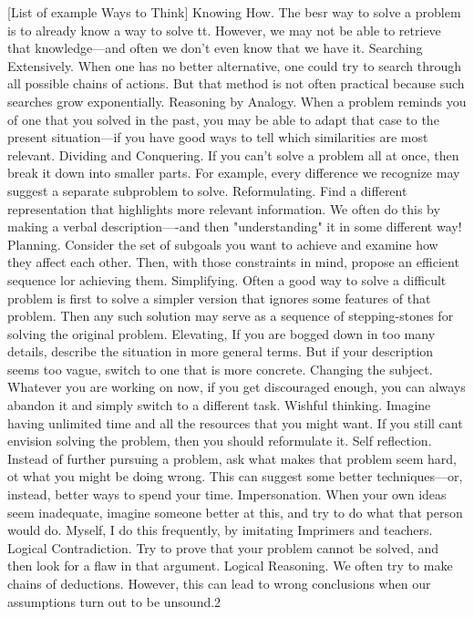 \documentclass[10pt,a4paper]{article}
\begin{document}
[List of example Ways to Think]
Knowing How. The besr way to solve a problem is to already know a way to solve tt. However, we may not be able to retrieve that knowledge—and often we don't even know that we have it.
Searching Extensively. When one has no better alternative, one could try to search through all possible chains of actions. But that method is not often practical because such searches grow exponentially.
Reasoning by Analogy. When a problem reminds you of one that you solved in the past, you may be able to adapt that case to the present situation—if you have good ways to tell which similarities are most relevant.
Dividing and Conquering. If you can't solve a problem all at once, then break it down into smaller parts. For example, every difference we recognize may suggest a separate subproblem to solve.
Reformulating. Find a different representation that highlights more relevant information. We often do this by making a verbal description—-and then "understanding" it in some different way!
Planning. Consider the set of subgoals you want to achieve and examine how they affect each other. Then, with those constraints in mind, propose an efficient sequence lor achieving them.
Simplifying. Often a good way to solve a difficult problem is first to solve a simpler version that ignores some features of that problem. Then any such solution may serve as a sequence of
stepping-stones for solving the original problem.
Elevating, If you are bogged down in too many details, describe the situation in more general terms. But if your description seems too vague, switch to one that is more concrete.
Changing the subject. Whatever you are working on now, if you get discouraged enough, you can always abandon it and simply switch to a different task.
Wishful thinking. Imagine having unlimited time and all the resources that you might want. If you still cant envision solving the problem, then you should reformulate it.
Self reflection. Instead of further pursuing a problem, ask what makes that problem seem hard, ot what you might be doing wrong. This can suggest some better techniques—or, instead, better ways to spend your time.
Impersonation. When your own ideas seem inadequate, imagine someone better at this, and try to do what that person would do. Myself, I do this frequently, by imitating Imprimers and teachers.
Logical Contradiction. Try to prove that your problem cannot be solved, and then look for a flaw in that argument.
Logical Reasoning. We often try to make chains of deductions. However, this can lead to wrong conclusions when our assumptions turn out to be unsound.2
\end{document}
